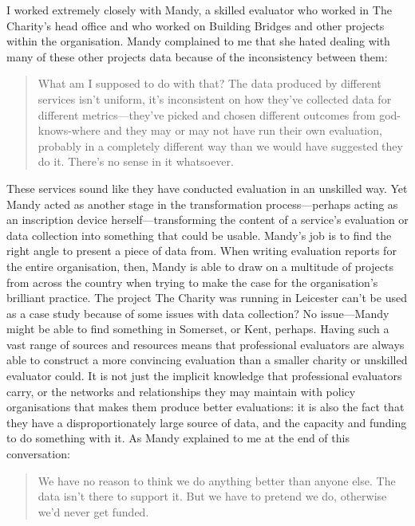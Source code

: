I worked extremely closely with Mandy, a skilled evaluator who worked in The Charity's head office and who worked on Building Bridges and other projects within the organisation. Mandy complained to me that she hated dealing with many of these other projects data because of the inconsistency between them:
\begin{quote}
What am I supposed to do with that? The data produced by different services isn't uniform, it's inconsistent on how they've collected data for different metrics—they've picked and chosen different outcomes from god-knows-where and they may or may not have run their own evaluation, probably in a completely different way than we would have suggested they do it. There's no sense in it whatsoever.
\end{quote}
These services sound like they have conducted evaluation in an unskilled way. Yet Mandy acted as another stage in the transformation process—perhaps acting as an inscription device herself—transforming the content of a service's evaluation or data collection into something that could be usable. Mandy's job is to find the right angle to present a piece of data from. When writing evaluation reports for the entire organisation, then, Mandy is able to draw on a multitude of projects from across the country when trying to make the case for the organisation's brilliant practice. The project The Charity was running in Leicester can't be used as a case study because of some issues with data collection? No issue—Mandy might be able to find something in Somerset, or Kent, perhaps.  Having such a vast range of sources and resources means that professional evaluators are always able to construct a more convincing evaluation than a smaller charity or unskilled evaluator could. It is not just the implicit knowledge that professional evaluators carry, or the networks and relationships they may maintain with policy organisations that makes them produce better evaluations: it is also the fact that they have a disproportionately large source of data, and the capacity and funding to do something with it. As Mandy explained to me at the end of this conversation:
\begin{quote}
We have no reason to think we do anything better than anyone else. The data isn't there to support it. But we have to pretend we do, otherwise we'd never get funded.
\end{quote}

